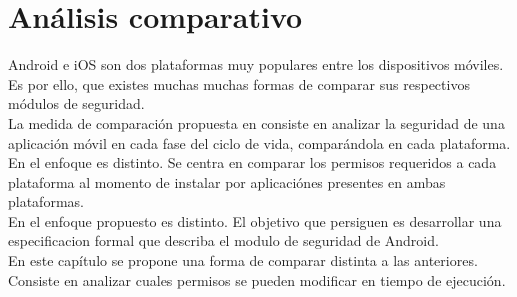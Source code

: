 \chapter{Análisis comparativo}
Android e iOS son dos plataformas muy populares entre los dispositivos móviles. Es por ello, que existes muchas  muchas formas de comparar sus respectivos módulos de seguridad.\\
La medida de comparación propuesta en \cite{YA2014} consiste en analizar la seguridad de una aplicación móvil en cada fase del ciclo de vida, comparándola en cada plataforma.\\
En \cite{HYGZD2013} el enfoque es distinto. Se centra en comparar los permisos requeridos a cada plataforma al momento de instalar por aplicaciónes presentes en ambas plataformas.\\
En \cite{Gor16, BCLR15, Rom14} el enfoque propuesto es distinto. El objetivo que persiguen es desarrollar una especificacion formal que describa el modulo de seguridad de Android.\\
En este capítulo se propone una forma de comparar distinta a las anteriores. Consiste en analizar cuales permisos se pueden modificar en tiempo de ejecución.\\
